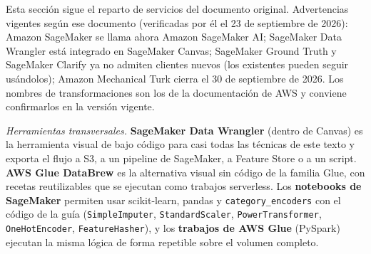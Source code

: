 \documentclass[11pt]{article}
\theoremstyle{definition}
\theoremstyle{remark}
\begin{document}
\noindent Esta sección sigue el reparto de servicios del documento original. Advertencias vigentes según ese documento (verificadas por él el 23 de septiembre de 2026): Amazon SageMaker se llama ahora Amazon SageMaker AI; SageMaker Data Wrangler está integrado en SageMaker Canvas; SageMaker Ground Truth y SageMaker Clarify ya no admiten clientes nuevos (los existentes pueden seguir usándolos); Amazon Mechanical Turk cierra el 30 de septiembre de 2026. Los nombres de transformaciones son los de la documentación de AWS y conviene confirmarlos en la versión vigente.

\medskip

\noindent \emph{Herramientas transversales.} \textbf{SageMaker Data Wrangler} (dentro de Canvas) es la herramienta visual de bajo código para casi todas las técnicas de este texto y exporta el flujo a S3, a un pipeline de SageMaker, a Feature Store o a un script. \textbf{AWS Glue DataBrew} es la alternativa visual sin código de la familia Glue, con recetas reutilizables que se ejecutan como trabajos serverless. Los \textbf{notebooks de SageMaker} permiten usar scikit-learn, pandas y \texttt{category\_encoders} con el código de la guía (\texttt{SimpleImputer}, \texttt{StandardScaler}, \texttt{PowerTransformer}, \texttt{OneHotEncoder}, \texttt{FeatureHasher}), y los \textbf{trabajos de AWS Glue} (PySpark) ejecutan la misma lógica de forma repetible sobre el volumen completo.

\medskip
\end{document}
